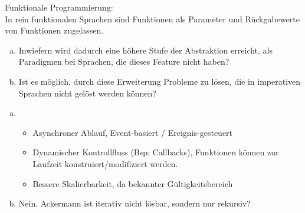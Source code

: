 \begin{card}
	Funktionale Programmierung:\\
	In rein funktionalen Sprachen sind Funktionen als Parameter und Rückgabewerte von Funktionen zugelassen. 
	\begin{enumerate}[a)]
	\item  Inwiefern wird dadurch eine höhere Stufe der Abstraktion erreicht, als Paradigmen bei Sprachen, die dieses Feature nicht haben?
	\item Ist es möglich, durch diese Erweiterung Probleme zu lösen, die in imperativen Sprachen nicht gelöst werden können?
	\end{enumerate}
	\hr
	\begin{enumerate}[a)]
	\item \begin{itemize}
		\item Asynchroner Ablauf, Event-basiert / Ereignis-gesteuert
		\item Dynamischer Kontrollfluss (Bsp: Callbacks), Funktionen können zur Laufzeit konstruiert/modifiziert werden.
		\item Bessere Skalierbarkeit, da bekannter Gültigkeitsbereich
		\end{itemize}
	\item  Nein. Ackermann ist iterativ nicht lösbar, sondern nur rekursiv?
	\end{enumerate}
\end{card}